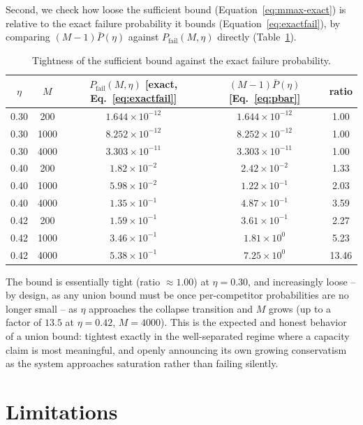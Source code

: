 \documentclass[11pt]{article}
\newcommand{\toprule}{\hline\hline}
\newcommand{\midrule}{\hline}
\newcommand{\bottomrule}{\hline\hline}
\begin{document}
Second, we check how loose the sufficient bound (Equation~\ref{eq:mmax-exact}) is relative to the
exact failure probability it bounds (Equation~\ref{eq:exactfail}), by comparing
$(M-1)\bar P(\eta)$ against $P_{\text{fail}}(M,\eta)$ directly (Table~\ref{tab:tightness}).

\begin{table}[h]
\centering
\begin{tabular}{ccccc}
\toprule
$\eta$ & $M$ & $P_{\text{fail}}(M,\eta)$ [exact, Eq.~\ref{eq:exactfail}] & $(M-1)\bar P(\eta)$ [Eq.~\ref{eq:pbar}] & ratio \\
\midrule
0.30 & 200  & $1.644\times10^{-12}$ & $1.644\times10^{-12}$ & 1.00 \\
0.30 & 1000 & $8.252\times10^{-12}$ & $8.252\times10^{-12}$ & 1.00 \\
0.30 & 4000 & $3.303\times10^{-11}$ & $3.303\times10^{-11}$ & 1.00 \\
0.40 & 200  & $1.82\times10^{-2}$   & $2.42\times10^{-2}$   & 1.33 \\
0.40 & 1000 & $5.98\times10^{-2}$   & $1.22\times10^{-1}$   & 2.03 \\
0.40 & 4000 & $1.35\times10^{-1}$   & $4.87\times10^{-1}$   & 3.59 \\
0.42 & 200  & $1.59\times10^{-1}$   & $3.61\times10^{-1}$   & 2.27 \\
0.42 & 1000 & $3.46\times10^{-1}$   & $1.81\times10^{0}$    & 5.23 \\
0.42 & 4000 & $5.38\times10^{-1}$   & $7.25\times10^{0}$    & 13.46 \\
\bottomrule
\end{tabular}
\caption{Tightness of the sufficient bound against the exact failure probability.}
\label{tab:tightness}
\end{table}

The bound is essentially tight (ratio $\approx 1.00$) at $\eta=0.30$, and increasingly loose --
by design, as any union bound must be once per-competitor probabilities are no longer small --
as $\eta$ approaches the collapse transition and $M$ grows (up to a factor of $13.5$ at
$\eta=0.42$, $M=4000$). This is the expected and honest behavior of a union bound: tightest
exactly in the well-separated regime where a capacity claim is most meaningful, and openly
announcing its own growing conservatism as the system approaches saturation rather than failing
silently.

\section{Limitations}
\label{sec:limitations}
\end{document}
